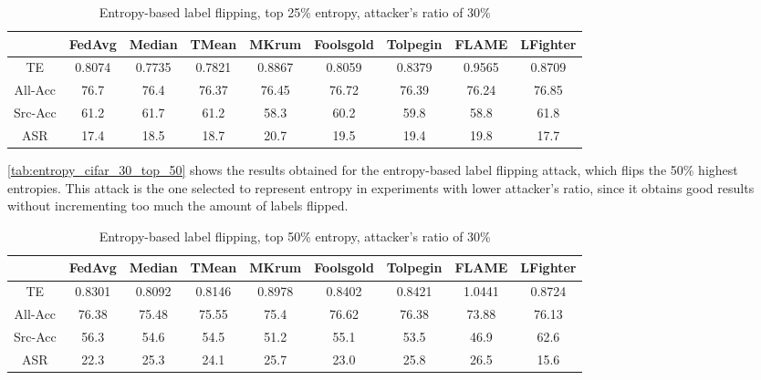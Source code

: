 \begin{table}[h!]
        \centering
        \small
        \begin{adjustbox}{center}
        \begin{tabular}{|c|c|c|c|c|c|c|c|c|}
            \hline
            & FedAvg & Median & TMean & MKrum & Foolsgold & Tolpegin & FLAME & LFighter \\
            \hline
            TE & 0.8074 & 0.7735 & 0.7821 & 0.8867 & 0.8059 & 0.8379 & 0.9565 & 0.8709 \\
            \hline
            All-Acc & 76.7 & 76.4 & 76.37 & 76.45 & 76.72 & 76.39 & 76.24 & 76.85 \\
            \hline
            Src-Acc & 61.2 & 61.7 & 61.2 & 58.3 & 60.2 & 59.8 & 58.8 & 61.8 \\
            \hline
            ASR & 17.4 & 18.5 & 18.7 & 20.7 & 19.5 & 19.4 & 19.8 & 17.7 \\
            \hline
        \end{tabular}
        \end{adjustbox}
        \caption{Entropy-based label flipping, top 25\% entropy, attacker's ratio of 30\%}
        \label{tab:entropy_cifar_30_top_25}
    \end{table}
    
\autoref{tab:entropy_cifar_30_top_50} shows the results obtained for the entropy-based label flipping attack, which flips the 50\% highest entropies.
This attack is the one selected to represent entropy in experiments with lower attacker's ratio, since it obtains good results without incrementing too much the amount of labels flipped.

\begin{table}[h!]
        \centering
        \small
        \begin{adjustbox}{center}
        \begin{tabular}{|c|c|c|c|c|c|c|c|c|}
            \hline
            & FedAvg & Median & TMean & MKrum & Foolsgold & Tolpegin & FLAME & LFighter \\
            \hline
            TE & 0.8301 & 0.8092 & 0.8146 & 0.8978 & 0.8402 & 0.8421 & 1.0441 & 0.8724 \\
            \hline
            All-Acc & 76.38 & 75.48 & 75.55 & 75.4 & 76.62 & 76.38 & 73.88 & 76.13 \\
            \hline
            Src-Acc & 56.3 & 54.6 & 54.5 & 51.2 & 55.1 & 53.5 & 46.9 & 62.6 \\
            \hline
            ASR & 22.3 & 25.3 & 24.1 & 25.7 & 23.0 & 25.8 & 26.5 & 15.6 \\
            \hline
        \end{tabular}
        \end{adjustbox}
        \caption{Entropy-based label flipping, top 50\% entropy, attacker's ratio of 30\%}
        \label{tab:entropy_cifar_30_top_50}
    \end{table}
    

